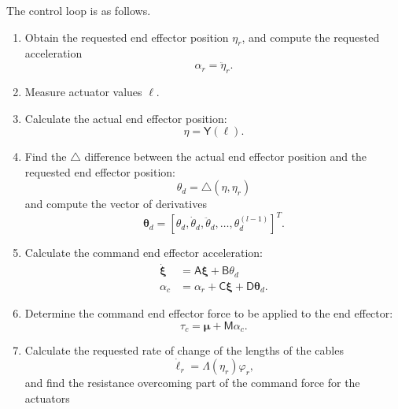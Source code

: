 \documentclass[oneside,twocolumn,reqno]{amsart}
\newcommand\tint{{\textstyle\int\!}}
\newcommand{\liediff}{\mathbin{\triangle}}
\begin{document}
The control loop is as follows.
\begin{enumerate}
\item \label{first step alg} Obtain the requested end effector position $\eta_r$, and compute the requested acceleration
\begin{equation}
\alpha_r = \ddot\eta_r .
\end{equation}
\item Measure actuator values $\bm\ell$.
\item Calculate the actual end effector position:
\begin{equation}
\eta = \mathsf Y(\bm\ell).
\end{equation}
\item Find the $\liediff$ difference between the actual end effector position and the requested end effector position:
\begin{equation}
\label{theta_d from liediff}
\theta_d = \liediff(\eta, \eta_r)
\end{equation}
and compute the vector of derivatives
\begin{equation}
\bm \theta_d = [\theta_d, \dot \theta_d, \ddot \theta_d, \dots, \theta_d^{(l-1)}]^T .
\end{equation}
\item \label{cable control} Calculate the command end effector acceleration:
\begin{align}
\label{closed-loop feed-forward robot alpha}
\dot{\bm \xi} &= \mathsf A \bm \xi + \mathsf B \theta_d \\
\label{closed-loop feed-forward robot alpha 2}
\alpha_c &= \alpha_r + \mathsf C \bm \xi + \mathsf D \bm \theta_d.
\end{align}
\item \label{determine torque-force} Determine the command end effector force to be applied to the end effector:
\begin{equation}
\tau_c = \bm \mu + \mathsf M \alpha_c.
\end{equation}
\item Calculate the requested rate of change of the lengths of the cables
\begin{equation}
\dot{\bm \ell}_r = \mathsf\Lambda(\eta_r) \varphi_r,
\end{equation}
and find the resistance overcoming part of the command force for the actuators

\end{enumerate}
\end{document}
